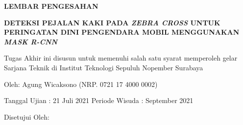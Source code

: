 \begin{center}
	\large
  \textbf{LEMBAR PENGESAHAN}
\end{center}

\thispagestyle{empty}

\begin{center}
  \textbf{DETEKSI PEJALAN KAKI PADA \textit{ZEBRA CROSS} UNTUK PERINGATAN DINI PENGENDARA MOBIL MENGGUNAKAN \textit{MASK R-CNN}}
\end{center}

\begingroup
  \small

  \begin{center}
    Tugas Akhir ini disusun untuk memenuhi salah satu syarat memperoleh gelar Sarjana Teknik di Institut Teknologi Sepuluh Nopember Surabaya
  \end{center}

  \begin{center}
    Oleh: Agung Wicaksono (NRP. 0721 17 4000 0002)
  \end{center}

  \begin{center}
    Tanggal Ujian :  21 Juli 2021
    Periode Wisuda : September 2021
  \end{center}

  \begin{center}
    Disetujui Oleh:
  \end{center}

  \begingroup
    \setlength{\tabcolsep}{0pt}

